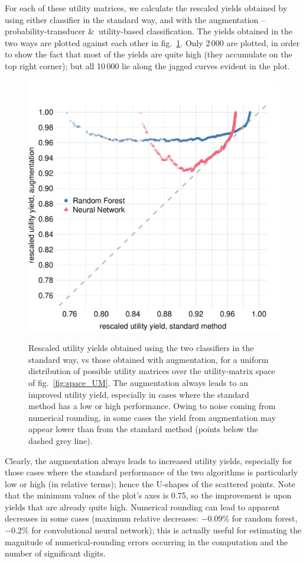 \documentclass[\ifafour a4paper,12pt,\else a5paper,10pt,\fi%
onecolumn,oneside,article,%
british%
]{memoir}
\theoremstyle{remark}
\theoremstyle{innote}
\newcommand*{\amp}{\&}
\renewcommand*{\|}[1][]{\nonscript\:#1\vert\nonscript\:\mathopen{}}
\newcommand*{\fig}{fig.}%
\newcommand*{\RF}{random forest}
\newcommand*{\CNN}{convolutional neural network}
\begin{document}
For each of these utility matrices, we calculate the rescaled yields obtained by using either classifier in the standard way, and with the augmentation -- probability-transducer \amp\ utility-based classification. The yields obtained in the two ways are plotted against each other in \fig~\ref{fig:RF_gain_UMspace}. Only 2\,000 are plotted, in order to show the fact that most of the yields are quite high (they accumulate on the top right corner); but all 10\,000 lie along the jagged curves evident in the plot.
\begin{figure}[t]
  \centering
  \includegraphics[width=\linewidth]{RFCNN_transducer_gains_max.pdf}\\
  \caption{Rescaled utility yields obtained using the two classifiers in the standard way, vs those obtained with augmentation, for a uniform distribution of possible utility matrices over the utility-matrix space of \fig~\ref{fig:space_UM}. The augmentation always leads to an improved utility yield, especially in cases where the standard method has a low or high performance. Owing to noise coming from numerical rounding, in some cases the yield from augmentation may appear lower than from the standard method (points below the dashed grey line).}
  \label{fig:RF_gain_UMspace}
\end{figure}

Clearly, the augmentation always leads to increased utility yields, especially for those cases where the standard performance of the two algorithms is particularly low or high (in relative terms); hence the U-shapes of the scattered points. Note that the minimum values of the plot's axes is 0.75, so the improvement is upon yields that are already quite high. Numerical rounding can lead to apparent decreases in some cases (maximum relative decreases: $-0.09\%$ for \RF, $-0.2\%$ for \CNN); this is actually useful for estimating the magnitude of numerical-rounding errors occurring in the computation and the number of significant digits.
\end{document}
